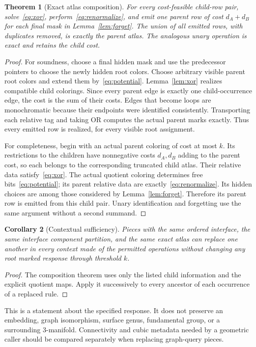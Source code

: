 \documentclass[11pt,letterpaper]{article}
\newtheorem{theorem}{Theorem}[section]
\newtheorem{corollary}[theorem]{Corollary}
\theoremstyle{definition}
\theoremstyle{remark}\newtheorem{remark}[theorem]{Remark}
\begin{document}
\begin{theorem}[Exact atlas composition]\label{thm:compose}
For every cost-feasible child-row pair, solve~\eqref{eq:xor}, perform~\eqref{eq:renormalize}, and emit one parent row of cost $d_A+d_B$ for each final mask in Lemma~\ref{lem:forget}. The union of all emitted rows, with duplicates removed, is exactly the parent atlas. The analogous unary operation is exact and retains the child cost.
\end{theorem}
\begin{proof}
For soundness, choose a final hidden mask and use the predecessor pointers to choose the newly hidden root colors. Choose arbitrary visible parent root colors and extend them by~\eqref{eq:potential}. Lemma~\ref{lem:xor} realizes compatible child colorings. Since every parent edge is exactly one child-occurrence edge, the cost is the sum of their costs. Edges that become loops are monochromatic because their endpoints were identified consistently. Transporting each relative tag and taking OR computes the actual parent marks exactly. Thus every emitted row is realized, for every visible root assignment.

For completeness, begin with an actual parent coloring of cost at most $k$. Its restrictions to the children have nonnegative costs $d_A,d_B$ adding to the parent cost, so each belongs to the corresponding truncated child atlas. Their relative data satisfy~\eqref{eq:xor}. The actual quotient coloring determines free bits~\eqref{eq:potential}; its parent relative data are exactly~\eqref{eq:renormalize}. Its hidden choices are among those considered by Lemma~\ref{lem:forget}. Therefore its parent row is emitted from this child pair. Unary identification and forgetting use the same argument without a second summand.
\end{proof}

\begin{corollary}[Contextual sufficiency]\label{cor:context}
Pieces with the same ordered interface, the same interface component partition, and the same exact atlas can replace one another in every context made of the permitted operations without changing any root marked response through threshold $k$.
\end{corollary}
\begin{proof}
The composition theorem uses only the listed child information and the explicit quotient maps. Apply it successively to every ancestor of each occurrence of a replaced rule.
\end{proof}
This is a statement about the specified response. It does not preserve an embedding, graph isomorphism, surface genus, fundamental group, or a surrounding 3-manifold. Connectivity and cubic metadata needed by a geometric caller should be compared separately when replacing graph-query pieces.
\end{document}
